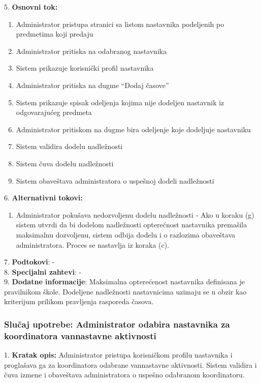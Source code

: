\documentclass{article}
\begin{document}
5. \textbf{Osnovni tok:} 
\begin{enumerate} [label=(\alph*)]
\item Administrator pristupa stranici sa listom nastavnika podeljenih po predmetima koji predaju
\item Administrator pritiska na odabranog nastavnika
\item Sistem prikazuje korisnički profil nastavnika
\item Administrator pritiska na dugme ``Dodaj časove''
\item Sistem prikazuje spisak odeljenja kojima nije dodeljen nastavnik iz odgovarajućeg predmeta
\item Administrator pritiskom na dugme bira odeljenje koje dodeljuje nastavniku
\item Sistem validira dodelu nadležnosti
\item Sistem čuva dodelu nadležnosti
\item Sistem obaveštava administratora o uspešnoj dodeli nadležnosti
\end{enumerate}

6. \textbf{Alternativni tokovi:}
\begin{enumerate} [label=(\roman*)]
    \item Administrator pokušava nedozvoljenu dodelu nadležnosti - Ako u koraku (g) sistem utvrdi da bi dodelom nadležnosti opterećnost nastavnika premašila maksimalnu dozvoljenu, sistem odbija dodelu i o razlozima obaveštava administratora. Proces se nastavlja iz koraka (c).
\end{enumerate}

7. \textbf{Podtokovi}: - \\

8. \textbf{Specijalni zahtevi}: - \\

9. \textbf{Dodatne informacije}: Maksimalna opterećenost nastavnika definisana je pravilnikom škole. Dodeljene nadležnosti nastavnicima uzimaju se u obzir kao kriterijum prilikom pravljenja rasporeda časova. \\

\subsubsection{Slučaj upotrebe: Administrator odabira nastavnika za koordinatora vannastavne aktivnosti}
1. \textbf{Kratak opis:} Administrator pristupa korisničkom profilu nastavnika i proglašava ga za koordinatora odabrane vannastavne aktivnosti. Sistem validira i čuva izmene i obaveštava administratora o uspešno odabranom koordinatoru. \\
\end{document}
